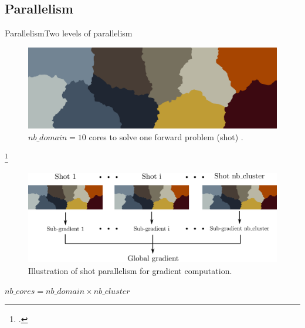 \subsection{Parallelism}
\begin{frame}{Parallelism}{Two levels of parallelism}

  \begin{overprint}
  \begin{figure}[H]
    \centering
    \includegraphics[scale=0.15]{image/partition.png}
    \caption*{$nb\_domain=10$ cores to solve one forward problem (shot) \footnotemark.}
    \label{partition}
  \end{figure}
  \addtocounter{footnote}{-1}
  \footcitetext{karypis1997parmetis}
  \addtocounter{footnote}{+1}
\begin{figure}[H]
  \centering
  \includegraphics[scale=0.055]{image/partition_cluster.pdf}
  \caption*{Illustration of shot parallelism for gradient computation.}
  \label{partition_cluster}
\end{figure}

$nb\_cores = nb\_domain \times nb\_cluster$

  \end{overprint}
\end{frame}



